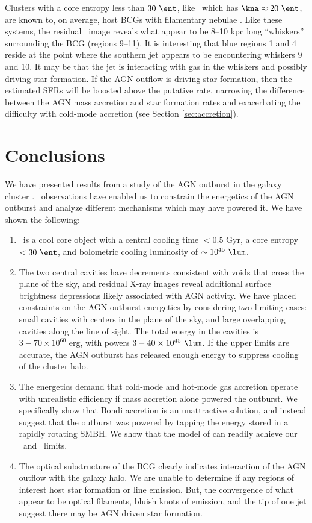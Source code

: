 \documentclass[11pt, preprint]{aastex}
\begin{document}
Clusters with a core entropy less than $30 ~\ent$, like \rbs\ which
has $\kna \approx 20 ~\ent$, are known to, on average, host BCGs with
filamentary nebulae \citep[\eg][]{mcdonald10}. Like these systems, the
residual \myi\ image reveals what appear to be 8--10 kpc long
``whiskers'' surrounding the BCG (regions 9--11). It is interesting
that blue regions 1 and 4 reside at the point where the southern jet
appears to be encountering whiskers 9 and 10. It may be that the jet
is interacting with gas in the whiskers and possibly driving star
formation. If the AGN outflow is driving star formation, then the
estimated SFRs will be boosted above the putative rate, narrowing the
difference between the AGN mass accretion and star formation rates and
exacerbating the difficulty with cold-mode accretion (see Section
\ref{sec:accretion}).

\section{Conclusions}
\label{sec:con}

We have presented results from a study of the AGN outburst in the
galaxy cluster \rbs. \cxo\ observations have enabled us to constrain
the energetics of the AGN outburst and analyze different mechanisms
which may have powered it. We have shown the following:
\begin{enumerate}
\item \rbs\ is a cool core object with a central cooling time $< 0.5$
  Gyr, a core entropy $< 30 ~\ent$, and bolometric cooling luminosity
  of $\sim 10^{45} ~\lum$.
\item The two central cavities have decrements consistent with voids
  that cross the plane of the sky, and residual X-ray images reveal
  additional surface brightness depressions likely associated with AGN
  activity. We have placed constraints on the AGN outburst energetics
  by considering two limiting cases: small cavities with centers in
  the plane of the sky, and large overlapping cavities along the line
  of sight. The total energy in the cavities is $3-70 \times 10^{60}$
  erg, with powers $3-40 \times 10^{45} ~\lum$. If the upper limits
  are accurate, the AGN outburst has released enough energy to
  suppress cooling of the cluster halo.
\item The energetics demand that cold-mode and hot-mode gas accretion
  operate with unrealistic efficiency if mass accretion alone powered
  the outburst. We specifically show that Bondi accretion is an
  unattractive solution, and instead suggest that the outburst was
  powered by tapping the energy stored in a rapidly rotating SMBH. We
  show that the model of \citet{gesspin} can readily achieve our
  \ecav\ and \pcav\ limits.
\item The optical substructure of the BCG clearly indicates
  interaction of the AGN outflow with the galaxy halo. We are unable
  to determine if any regions of interest host star formation or line
  emission. But, the convergence of what appear to be optical
  filaments, bluish knots of emission, and the tip of one jet suggest
  there may be AGN driven star formation.
\end{enumerate}
\end{document}
